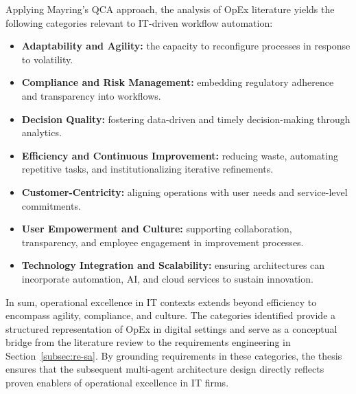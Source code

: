 Applying Mayring’s QCA approach, the analysis of OpEx literature yields the following categories relevant to IT-driven workflow automation:
\begin{itemize}
    \item \textbf{Adaptability and Agility:} the capacity to reconfigure processes in response to volatility.
    \item \textbf{Compliance and Risk Management:} embedding regulatory adherence and transparency into workflows.
    \item \textbf{Decision Quality:} fostering data-driven and timely decision-making through analytics.
    \item \textbf{Efficiency and Continuous Improvement:} reducing waste, automating repetitive tasks, and institutionalizing iterative refinements.
    \item \textbf{Customer-Centricity:} aligning operations with user needs and service-level commitments.
    \item \textbf{User Empowerment and Culture:} supporting collaboration, transparency, and employee engagement in improvement processes.
    \item \textbf{Technology Integration and Scalability:} ensuring architectures can incorporate automation, AI, and cloud services to sustain innovation.
\end{itemize}

In sum, operational excellence in IT contexts extends beyond efficiency to encompass agility, compliance, and culture. The categories identified provide a structured representation of OpEx in digital settings and serve as a conceptual bridge from the literature review to the requirements engineering in Section~\ref{subsec:re-sa}. By grounding requirements in these categories, the thesis ensures that the subsequent multi-agent architecture design directly reflects proven enablers of operational excellence in IT firms.

